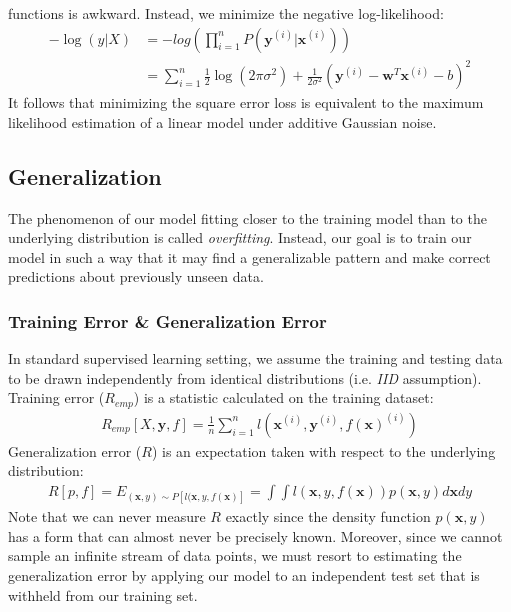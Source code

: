 \documentclass[a4paper,12pt]{article}
\theoremstyle{definition}
\begin{document}
functions is awkward. Instead, we minimize the negative log-likelihood:
\begin{equation*}
    \begin{aligned}
        -\log(y|X) & = -log(\prod_{i=1}^{n}P(\mathbf{y}^{(i)}|\mathbf{x}^{(i)}))                                                               \\
                   & = \sum_{i=1}^{n} \frac{1}{2}\log(2\pi\sigma^2) + \frac{1}{2\sigma^2}(\mathbf{y}^{(i)}-\mathbf{w}^T\mathbf{x}^{(i)} - b)^2
    \end{aligned}
\end{equation*}
It follows that minimizing the square error loss is equivalent to the maximum likelihood estimation of a linear model
under additive Gaussian noise.

\subsection*{Generalization}
The phenomenon of our model fitting closer to the training model than to the underlying distribution is called \textit{overfitting}.
Instead, our goal is to train our model in such a way that it may find a generalizable pattern and make correct
predictions about previously unseen data.
\subsubsection*{Training Error \& Generalization Error}
In standard supervised learning setting, we assume the training and testing data to be drawn independently from
identical distributions (i.e. \textit{IID} assumption).
Training error ($R_{emp}$) is a statistic calculated on the training dataset:
\begin{equation*}
    \begin{aligned}
        R_{emp}[X,\mathbf{y},f] = \frac{1}{n}\sum_{i=1}^{n}l(\mathbf{x}^{(i)},\mathbf{y}^{(i)},f(\mathbf{x})^{(i)})
    \end{aligned}
\end{equation*}
Generalization error ($R$) is an expectation taken with respect to the underlying distribution:
\begin{equation*}
    \begin{aligned}
        R[p,f] = E_{(\mathbf{x},y)\sim P[l(\mathbf{x},y,f(\mathbf{x})]} = \int\int l(\mathbf{x},y,f(\mathbf{x}))p(\mathbf{x},y)d\mathbf{x}dy
    \end{aligned}
\end{equation*}
Note that we can never measure $R$ exactly since the density function $p(\mathbf{x},y)$ has a form that can almost never
be precisely known. Moreover, since we cannot sample an infinite stream of data points, we must resort to estimating
the generalization error by applying our model to an independent test set that is withheld from our training set.
\end{document}
